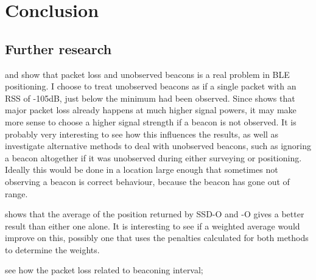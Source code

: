 \chapter{Conclusion}

\section{Further research}
 and  show that packet loss and unobserved beacons is a real problem in BLE positioning.
I choose to treat unobserved beacons as if a single packet with an RSS of -105dB, just below the minimum had been observed.
Since  shows that major packet loss already happens at much higher signal powers, it may make more sense to choose a higher signal strength if a beacon is not observed.
It is probably very interesting to see how this influences the results, as well as investigate alternative methods to deal with unobserved beacons, such as ignoring a beacon altogether if it was unobserved during either surveying or positioning.
Ideally this would be done in a location large enough that sometimes not observing a beacon is correct behaviour, because the beacon has gone out of range.

 shows that the average of the position returned by SSD-O and \aBRP-O gives a better result than either one alone.
It is interesting to see if a weighted average would improve on this, possibly one that uses the penalties calculated for both methods to determine the weights.


see how the packet loss related to beaconing interval;
